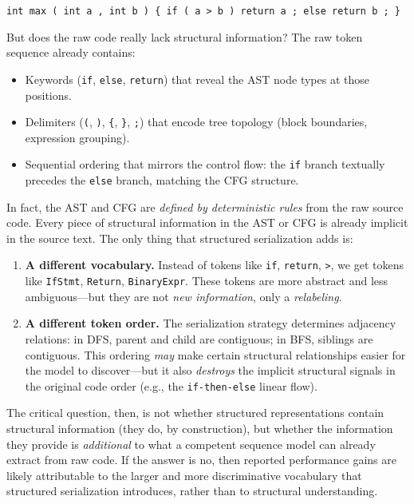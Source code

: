 \documentclass[pdflatex,sn-mathphys,Numbered]{sn-jnl}
\begin{document}
\begin{center}
\texttt{int max ( int a , int b ) \{ if ( a > b ) return a ; else return b ; \}}
\end{center}

But does the raw code really lack structural information? The raw token sequence already contains:
\begin{itemize}
\item Keywords (\texttt{if}, \texttt{else}, \texttt{return}) that reveal the AST node types at those positions.
\item Delimiters (\texttt{(}, \texttt{)}, \texttt{\{}, \texttt{\}}, \texttt{;}) that encode tree topology (block boundaries, expression grouping).
\item Sequential ordering that mirrors the control flow: the \texttt{if} branch textually precedes the \texttt{else} branch, matching the CFG structure.
\end{itemize}

In fact, the AST and CFG are \emph{defined by deterministic rules} from the raw source code. Every piece of structural information in the AST or CFG is already implicit in the source text. The only thing that structured serialization adds is:

\begin{enumerate}
\item \textbf{A different vocabulary.} Instead of tokens like \texttt{if}, \texttt{return}, \texttt{>}, we get tokens like \texttt{IfStmt}, \texttt{Return}, \texttt{BinaryExpr}. These tokens are more abstract and less ambiguous---but they are not \emph{new information}, only a \emph{relabeling}.

\item \textbf{A different token order.} The serialization strategy determines adjacency relations: in DFS, parent and child are contiguous; in BFS, siblings are contiguous. This ordering \emph{may} make certain structural relationships easier for the model to discover---but it also \emph{destroys} the implicit structural signals in the original code order (e.g., the \texttt{if-then-else} linear flow).
\end{enumerate}

The critical question, then, is not whether structured representations contain structural information (they do, by construction), but whether the information they provide is \emph{additional} to what a competent sequence model can already extract from raw code. If the answer is no, then reported performance gains are likely attributable to the larger and more discriminative vocabulary that structured serialization introduces, rather than to structural understanding.
\end{document}
